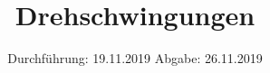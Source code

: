 

\subject{Versuchsnummer: 102}
\title{Drehschwingungen}
\date{%
  Durchführung: 19.11.2019
  \hspace{3em}
  Abgabe: 26.11.2019
}



\maketitle
\thispagestyle{empty}
\tableofcontents
\newpage




\newpage
\nocite{*}
\printbibliography


